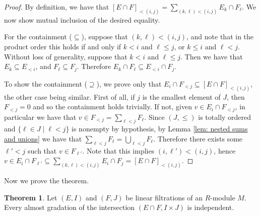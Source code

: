 \documentclass[oneside,11pt]{amsart}
\theoremstyle{definition}
\newtheorem{proof techniques}{Proof Techniques}
\newtheorem{theorem}{Theorem}
\begin{document}
\begin{proof}
By definition, we have that $[E \cap F]_{< (i , j)} = \sum_{(k , \ell) < (i , j)} E_k \cap F_\ell$. We now show mutual inclusion of the desired equality. 

For the containment ($\subseteq$), suppose that $(k , \ell ) < (i , j)$, and note that in the product order this holds if and only if $k < i$ and $\ell \leq j$, or $k \leq i$ and $\ell < j$. Without loss of generality, suppose that $k < i$ and $\ell \leq j$. Then we have that $E_k \subseteq E_{<i}$, and $F_\ell \subseteq F_j$. Therefore $E_k \cap F_\ell \subseteq E_{< i} \cap F_j$.

To show the containment ($\supseteq$), we prove only that $E_i \cap F_{< j} \subseteq [E \cap F]_{< (i , j)}$, the other case being similar. First of all, if $j$ is the smallest element of $J$, then $F_{<j} = 0$ and so the containment holds trivially. If not, given $v \in E_i \cap F_{< j}$, in particular we have that $v \in F_{< j} = \sum_{\ell < j} F_\ell$. Since $(J , \leq)$ is totally ordered and $\{ \ell \in J \mid \ell < j \}$ is nonempty by hypothesis, by Lemma \ref{lem: nested sums and unions} we have that $\sum_{\ell < j} F_\ell = \bigcup_{\ell < j} F_\ell$. Therefore there exists some $\ell' < j$ such that $v \in F_{\ell '}$. Note that this implies $(i , \ell') < (i , j)$, hence $v \in E_i \cap F_{\ell '} \subseteq \sum_{(k , \ell) < (i , j)} E_i \cap F_j = [E \cap F]_{< (i , j)}$. 
\end{proof}

Now we prove the theorem. 

\begin{theorem}\label{thm:ag of the intersection of two linear filts is ind}
Let $(E , I)$ and $(F , J)$ be linear filtrations of an $R$-module $M$. Every almost gradation of the intersection $(E \cap F , I \times J)$ is independent.  
\end{theorem}
\end{document}
